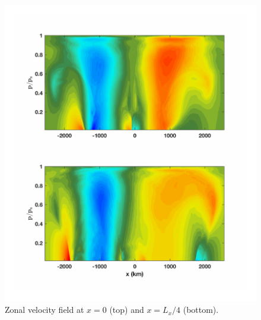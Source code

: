 \begin{figure}[H]
\vspace{-2em}
\includegraphics[scale=1]{Chapter3/img/U_1_Day11}
\caption{Zonal velocity field at $x = 0$ (top) and $x = L_x/4$ (bottom).}
\label{fig:U_1_Day11}
\end{figure}

